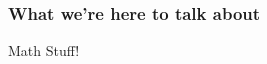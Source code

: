 \documentclass{beamer}
\theoremstyle{definition}
\begin{document}


\begin{frame}
\frametitle{What we're here to talk about}
\begin{center}
{\Huge Math Stuff!}
\end{center}
\end{frame}
\end{document}
